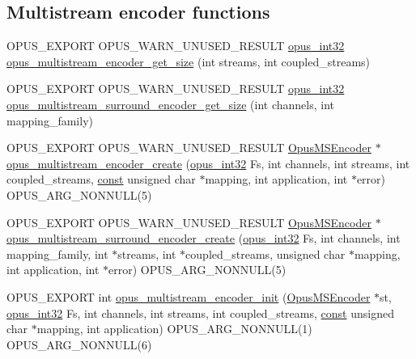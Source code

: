 \subsection*{Multistream encoder functions}
\begin{DoxyCompactItemize}
\item 
O\+P\+U\+S\+\_\+\+E\+X\+P\+O\+RT O\+P\+U\+S\+\_\+\+W\+A\+R\+N\+\_\+\+U\+N\+U\+S\+E\+D\+\_\+\+R\+E\+S\+U\+LT \hyperlink{opus__types_8h_aa4d309d6f80b99dbabebc8f98879ab9a}{opus\+\_\+int32} \hyperlink{group__opus__multistream_ga598e82225e53af23017e0c96f4eaf3b4}{opus\+\_\+multistream\+\_\+encoder\+\_\+get\+\_\+size} (int streams, int coupled\+\_\+streams)
\item 
O\+P\+U\+S\+\_\+\+E\+X\+P\+O\+RT O\+P\+U\+S\+\_\+\+W\+A\+R\+N\+\_\+\+U\+N\+U\+S\+E\+D\+\_\+\+R\+E\+S\+U\+LT \hyperlink{opus__types_8h_aa4d309d6f80b99dbabebc8f98879ab9a}{opus\+\_\+int32} \hyperlink{group__opus__multistream_ga21bf3d342217f28822f676b17bd21144}{opus\+\_\+multistream\+\_\+surround\+\_\+encoder\+\_\+get\+\_\+size} (int channels, int mapping\+\_\+family)
\item 
O\+P\+U\+S\+\_\+\+E\+X\+P\+O\+RT O\+P\+U\+S\+\_\+\+W\+A\+R\+N\+\_\+\+U\+N\+U\+S\+E\+D\+\_\+\+R\+E\+S\+U\+LT \hyperlink{group__opus__multistream_gae5826674d142fc873ebc1d781c507dd7}{Opus\+M\+S\+Encoder} $\ast$ \hyperlink{group__opus__multistream_ga984c19f4faa4db82370eb907f8eaf452}{opus\+\_\+multistream\+\_\+encoder\+\_\+create} (\hyperlink{opus__types_8h_aa4d309d6f80b99dbabebc8f98879ab9a}{opus\+\_\+int32} Fs, int channels, int streams, int coupled\+\_\+streams, \hyperlink{zconf_8h_a2c212835823e3c54a8ab6d95c652660e}{const} unsigned char $\ast$mapping, int application, int $\ast$error) O\+P\+U\+S\+\_\+\+A\+R\+G\+\_\+\+N\+O\+N\+N\+U\+LL(5)
\item 
O\+P\+U\+S\+\_\+\+E\+X\+P\+O\+RT O\+P\+U\+S\+\_\+\+W\+A\+R\+N\+\_\+\+U\+N\+U\+S\+E\+D\+\_\+\+R\+E\+S\+U\+LT \hyperlink{group__opus__multistream_gae5826674d142fc873ebc1d781c507dd7}{Opus\+M\+S\+Encoder} $\ast$ \hyperlink{group__opus__multistream_ga1358d7af19572d163ec982447aa20ee9}{opus\+\_\+multistream\+\_\+surround\+\_\+encoder\+\_\+create} (\hyperlink{opus__types_8h_aa4d309d6f80b99dbabebc8f98879ab9a}{opus\+\_\+int32} Fs, int channels, int mapping\+\_\+family, int $\ast$streams, int $\ast$coupled\+\_\+streams, unsigned char $\ast$mapping, int application, int $\ast$error) O\+P\+U\+S\+\_\+\+A\+R\+G\+\_\+\+N\+O\+N\+N\+U\+LL(5)
\item 
O\+P\+U\+S\+\_\+\+E\+X\+P\+O\+RT int \hyperlink{group__opus__multistream_gaf9045180b3a93d7cc3d1197859b767a8}{opus\+\_\+multistream\+\_\+encoder\+\_\+init} (\hyperlink{group__opus__multistream_gae5826674d142fc873ebc1d781c507dd7}{Opus\+M\+S\+Encoder} $\ast$st, \hyperlink{opus__types_8h_aa4d309d6f80b99dbabebc8f98879ab9a}{opus\+\_\+int32} Fs, int channels, int streams, int coupled\+\_\+streams, \hyperlink{zconf_8h_a2c212835823e3c54a8ab6d95c652660e}{const} unsigned char $\ast$mapping, int application) O\+P\+U\+S\+\_\+\+A\+R\+G\+\_\+\+N\+O\+N\+N\+U\+LL(1) O\+P\+U\+S\+\_\+\+A\+R\+G\+\_\+\+N\+O\+N\+N\+U\+LL(6)

\end{DoxyCompactItemize}
